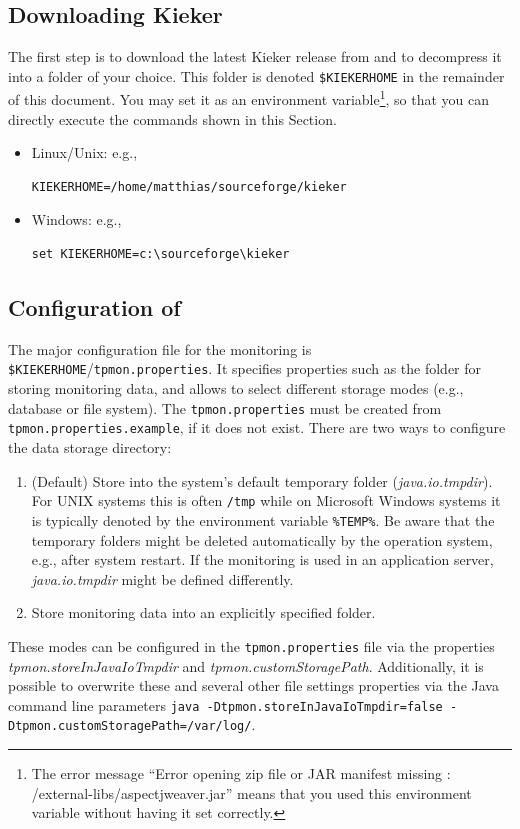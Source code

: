 \documentclass[a4paper,12pt]{scrartcl}
\begin{document}
\subsection{Downloading Kieker}
The first step is to download the latest Kieker release from \kiekerurl{} and to decompress it into a folder of your choice. This folder is denoted \texttt{\$KIEKERHOME} in the remainder of this document. You may set it as an environment variable\footnote{The error message ``Error opening zip file or JAR manifest missing : /external-libs/aspectjweaver.jar'' means that you used this environment variable without having it set correctly.}, so that you can directly execute the commands shown in this Section.
\begin{itemize}
 \item Linux/Unix: e.g., %
\begin{lstlisting}[caption={}]
KIEKERHOME=/home/matthias/sourceforge/kieker
\end{lstlisting}
\item Windows: e.g.,
\begin{lstlisting}[caption={}]
set KIEKERHOME=c:\sourceforge\kieker
\end{lstlisting}
\end{itemize}

\subsection{Configuration of \tpmon{}}
The major configuration file for the monitoring is \texttt{\$KIEKERHOME}/\texttt{tpmon.properties}. It specifies properties such as the folder for storing monitoring data, and allows to select different storage modes (e.g., database or file system). The \texttt{tpmon.properties} must be created from \texttt{tpmon.properties.example}, if it does not exist. There are two ways to configure the data storage directory:
\begin{enumerate}
\item (Default) Store into the system's default temporary folder (\textit{java.io.tmpdir}). For UNIX systems this is often \texttt{/tmp} while on Microsoft Windows systems it is typically %
denoted by the environment variable \texttt{\%TEMP\%}. Be aware that the temporary folders might be deleted automatically by the operation system, e.g., after system restart. If the monitoring is used in an application server, \textit{java.io.tmpdir} might be defined differently.
\item Store monitoring data into an explicitly specified folder.
\end{enumerate}
These modes can be configured in the \texttt{tpmon.properties} file via the properties \linebreak[4] \textit{tpmon.storeInJavaIoTmpdir} and \textit{tpmon.customStoragePath}. Additionally, it is possible to overwrite these and several other file settings properties via the Java command line parameters {\footnotesize \texttt{java -Dtpmon.storeInJavaIoTmpdir=false -Dtpmon.customStoragePath=/var/log/}}.
\end{document}
